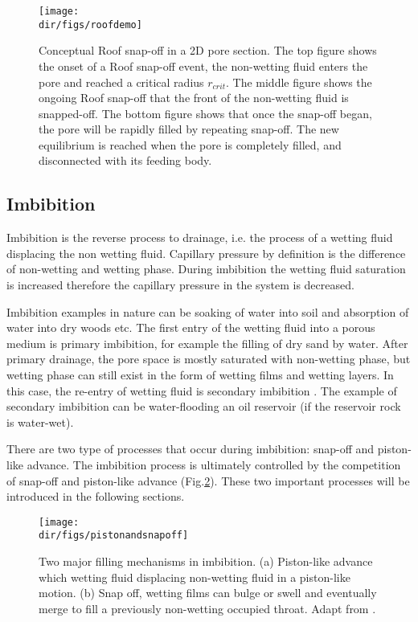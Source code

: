 \begin{figure}[htbp]
  \centering
  \texttt{[image: \\dir/figs/roofdemo]}
  \caption{Conceptual Roof snap-off in a 2D pore section. The top figure shows the onset of a Roof snap-off event, the non-wetting fluid enters the pore and reached a critical radius $r_{crit}$. The middle figure shows the ongoing Roof snap-off that the front of the non-wetting fluid is snapped-off. The bottom figure shows that once the snap-off began, the pore will be rapidly filled by repeating snap-off. The new equilibrium is reached when the pore is completely filled, and disconnected with its feeding body.}
  \label{roofdemo}
\end{figure}

\subsection{Imbibition}
Imbibition is the reverse process to drainage, i.e. the process of a wetting fluid displacing the non wetting fluid. Capillary pressure by definition is the difference of non-wetting and wetting phase. During imbibition the wetting fluid saturation is increased therefore the capillary pressure in the system is decreased. 

Imbibition examples in nature can be soaking of water into soil and absorption of water into dry woods etc. The first entry of the wetting fluid into a porous medium is primary imbibition, for example the filling of dry sand by water. After primary drainage, the pore space is mostly saturated with non-wetting phase, but wetting phase can still exist in the form of wetting films and wetting layers. In this case, the re-entry of wetting fluid is secondary imbibition \citep{blunt2017multiphase}. The example of secondary imbibition can be water-flooding an oil reservoir (if the reservoir rock is water-wet).

There are two type of processes that occur during imbibition: snap-off and piston-like advance. The imbibition process is ultimately controlled by the competition of snap-off and piston-like advance (Fig.\ref{pistonandsnappoff}). These two important processes will be introduced in the following sections.

\begin{figure}[htbp]
  \centering
  \texttt{[image: \\dir/figs/pistonandsnapoff]}
  \caption{Two major filling mechanisms in imbibition. (a) Piston-like advance which wetting fluid displacing non-wetting fluid in a piston-like motion. (b) Snap off, wetting films can bulge or swell and eventually merge to fill a previously non-wetting occupied throat. Adapt from \citet{lenormand1984role}.}
  \label{pistonandsnappoff}
\end{figure}

